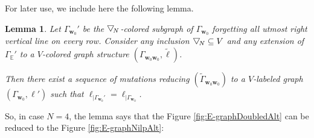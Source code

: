 \documentclass[11pt, reqno]{amsart}
\newtheorem{lemma}[theorem]{Lemma}
\theoremstyle{definition}
\numberwithin{equation}{section}
\newcommand{\btd}[1]{\raisebox{\depth}{$\bigtriangledown$\!}_{#1}}
\begin{document}
For later use, we include here the following lemma. 

\begin{lemma}\label{LemLongestDouble}
Let $\Gamma_{\mathbf{w}_0}'$ be the $\btd{N}$-colored subgraph of $\Gamma_{\mathbf{w}_0}$ forgetting all utmost right vertical line on every row. Consider any inclusion $\btd{N}\subseteq V$ and any extension of $\Gamma_{\mathbb{E}}'$ to a $V$-colored graph structure $(\Gamma_{\mathbf{w}_0\mathbf{w}_0},\widetilde{\ell})$.

Then there exist a sequence of mutations reducing $(\widetilde{\Gamma}_{\mathbf{w}_0\mathbf{w}_0})$ to a $V$-labeled graph $(\Gamma_{\mathbf{w}_0},\ell')$ such that $\ell_{\mid \Gamma_{\mathbf{w}_0}'} = \ell_{\mid \Gamma_{\mathbf{w}_0}}$.  
\end{lemma} 

So, in case $N=4$, the lemma says that the Figure \ref{fig:E-graphDoubledAlt} can be reduced to the Figure \ref{fig:E-graphNilpAlt}:
\end{document}
